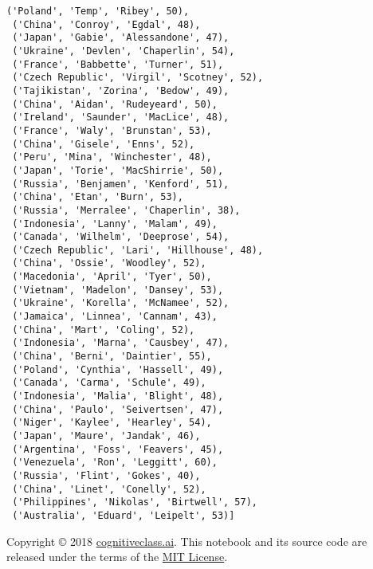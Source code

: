 \documentclass[11pt]{article}
\begin{document}
\begin{tcolorbox}[breakable, size=fbox, boxrule=.5pt, pad at break*=1mm, opacityfill=0]
\begin{Verbatim}[commandchars=\\\{\}]
 ('Poland', 'Temp', 'Ribey', 50),
 ('China', 'Conroy', 'Egdal', 48),
 ('Japan', 'Gabie', 'Alessandone', 47),
 ('Ukraine', 'Devlen', 'Chaperlin', 54),
 ('France', 'Babbette', 'Turner', 51),
 ('Czech Republic', 'Virgil', 'Scotney', 52),
 ('Tajikistan', 'Zorina', 'Bedow', 49),
 ('China', 'Aidan', 'Rudeyeard', 50),
 ('Ireland', 'Saunder', 'MacLice', 48),
 ('France', 'Waly', 'Brunstan', 53),
 ('China', 'Gisele', 'Enns', 52),
 ('Peru', 'Mina', 'Winchester', 48),
 ('Japan', 'Torie', 'MacShirrie', 50),
 ('Russia', 'Benjamen', 'Kenford', 51),
 ('China', 'Etan', 'Burn', 53),
 ('Russia', 'Merralee', 'Chaperlin', 38),
 ('Indonesia', 'Lanny', 'Malam', 49),
 ('Canada', 'Wilhelm', 'Deeprose', 54),
 ('Czech Republic', 'Lari', 'Hillhouse', 48),
 ('China', 'Ossie', 'Woodley', 52),
 ('Macedonia', 'April', 'Tyer', 50),
 ('Vietnam', 'Madelon', 'Dansey', 53),
 ('Ukraine', 'Korella', 'McNamee', 52),
 ('Jamaica', 'Linnea', 'Cannam', 43),
 ('China', 'Mart', 'Coling', 52),
 ('Indonesia', 'Marna', 'Causbey', 47),
 ('China', 'Berni', 'Daintier', 55),
 ('Poland', 'Cynthia', 'Hassell', 49),
 ('Canada', 'Carma', 'Schule', 49),
 ('Indonesia', 'Malia', 'Blight', 48),
 ('China', 'Paulo', 'Seivertsen', 47),
 ('Niger', 'Kaylee', 'Hearley', 54),
 ('Japan', 'Maure', 'Jandak', 46),
 ('Argentina', 'Foss', 'Feavers', 45),
 ('Venezuela', 'Ron', 'Leggitt', 60),
 ('Russia', 'Flint', 'Gokes', 40),
 ('China', 'Linet', 'Conelly', 52),
 ('Philippines', 'Nikolas', 'Birtwell', 57),
 ('Australia', 'Eduard', 'Leipelt', 53)]
\end{Verbatim}
\end{tcolorbox}
        
    Copyright © 2018
\href{cognitiveclass.ai?utm_source=bducopyrightlink\&utm_medium=dswb\&utm_campaign=bdu}{cognitiveclass.ai}.
This notebook and its source code are released under the terms of the
\href{https://bigdatauniversity.com/mit-license/}{MIT License}.


    
    
    
\end{document}
